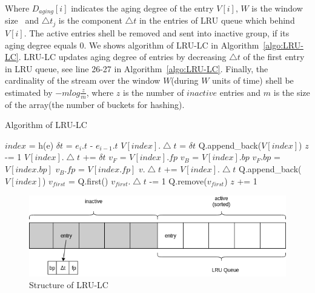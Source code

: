 Where $D_{aging}[i]$ indicates the aging degree of the entry $V[i]$, $W$ is the
window size~\cite{shan2016lru} and $\bigtriangleup t_j$ is the component
$\bigtriangleup t$ in the entries of LRU queue which behind $V[i]$. The active
entries shell be removed and sent into inactive group, if its aging degree
equals 0. We shows algorithm of LRU-LC in Algorithm~\ref{algo:LRU-LC}. LRU-LC
updates aging degree of entries by decreasing $\bigtriangleup t$ of the first
entry in LRU queue, see line 26-27 in Algorithm~\ref{algo:LRU-LC}. Finally, the
cardinality of the stream over the window $W$(during $W$ units of time) shell be
estimated by $ -mlog\frac{z}{m}$, where $z$ is the number of $inactive$ entries
and $m$ is the size of the array(the number of buckets for hashing).


\begin{algorithm}
\caption{Algorithm of LRU-LC}
\label{algo:LRU-LC}
\begin{algorithmic}[1]
\Input
\EndInput
\Output
\EndOutput

\State $index$ = h(e) 
\State $\delta t$ = $e_i.t$ - $e_{i-1}.t$
    \State $V[index].\bigtriangleup t$ = $\delta t$
    \State Q.append\_back($V[index]$)
    \State $z$ -= 1
\Else {}
     
        \State $V[index].\bigtriangleup t$ += $\delta t$
    \Else
        \State $v_F$ = $V[index].fp$
        \State $v_B$ = $V[index].bp$
        \State $v_F.bp$ = $V[index.bp]$
        \State $v_B.fp$ = $V[index.fp]$
        \State $v.\bigtriangleup t$ += $V[index].\bigtriangleup t$
        \State Q.append\_back($V[index]$)
    \EndIf
\EndIf
\State $v_{first}$ = Q.first() 
\State $v_{first}.\bigtriangleup t$ -= 1
    \State Q.remove($v_{first}$)
    \State $z$ += 1
\EndIf
\end{algorithmic}
\end{algorithm}

\begin{figure}
    \centering
    \includegraphics[width=0.8\columnwidth]{figures/LRU-LC.png}
    \caption{Structure of LRU-LC}
    \label{fig:LRU-LC}
\end{figure}

